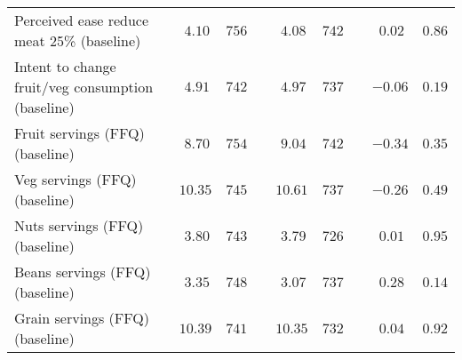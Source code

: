 \begin{table*}[ht]
\begin{center}
\begin{tabular}{lcccccccc}
Perceived ease reduce meat 25\% (baseline)&$~4.10$&$756$&&$~4.08$&$742$&&$~0.02$&$0.86$\tabularnewline
Intent to change fruit/veg consumption (baseline)&$~4.91$&$742$&&$~4.97$&$737$&&$-0.06$&$0.19$\tabularnewline
Fruit servings (FFQ) (baseline)&$~8.70$&$754$&&$~9.04$&$742$&&$-0.34$&$0.35$\tabularnewline
Veg servings (FFQ) (baseline)&$10.35$&$745$&&$10.61$&$737$&&$-0.26$&$0.49$\tabularnewline
Nuts servings (FFQ) (baseline)&$~3.80$&$743$&&$~3.79$&$726$&&$~0.01$&$0.95$\tabularnewline
Beans servings (FFQ) (baseline)&$~3.35$&$748$&&$~3.07$&$737$&&$~0.28$&$0.14$\tabularnewline
Grain servings (FFQ) (baseline)&$10.39$&$741$&&$10.35$&$732$&&$~0.04$&$0.92$\tabularnewline
\hline
\end{tabular}\end{center}

\end{table*}
